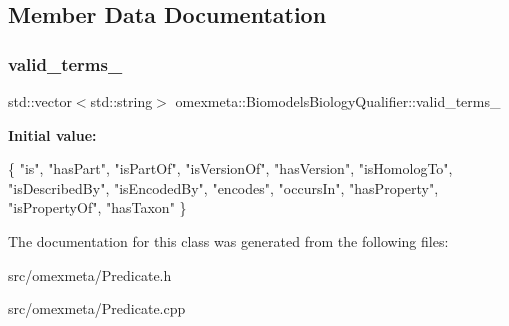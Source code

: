 \subsection{Member Data Documentation}
\mbox{\label{classomexmeta_1_1BiomodelsBiologyQualifier_a5ae1a3da58f05beb1e8b389f36f486bf}} 
\subsubsection{\texorpdfstring{valid\+\_\+terms\+\_\+}{valid\_terms\_}}
{\footnotesize\ttfamily std\+::vector$<$std\+::string$>$ omexmeta\+::\+Biomodels\+Biology\+Qualifier\+::valid\+\_\+terms\+\_\+}

{\bfseries Initial value\+:}
\begin{DoxyCode}
\{
                \textcolor{stringliteral}{"is"},
                \textcolor{stringliteral}{"hasPart"},
                \textcolor{stringliteral}{"isPartOf"},
                \textcolor{stringliteral}{"isVersionOf"},
                \textcolor{stringliteral}{"hasVersion"},
                \textcolor{stringliteral}{"isHomologTo"},
                \textcolor{stringliteral}{"isDescribedBy"},
                \textcolor{stringliteral}{"isEncodedBy"},
                \textcolor{stringliteral}{"encodes"},
                \textcolor{stringliteral}{"occursIn"},
                \textcolor{stringliteral}{"hasProperty"},
                \textcolor{stringliteral}{"isPropertyOf"},
                \textcolor{stringliteral}{"hasTaxon"}
        \}
\end{DoxyCode}


The documentation for this class was generated from the following files\+:\begin{DoxyCompactItemize}
\item 
src/omexmeta/Predicate.\+h\item 
src/omexmeta/Predicate.\+cpp\end{DoxyCompactItemize}
